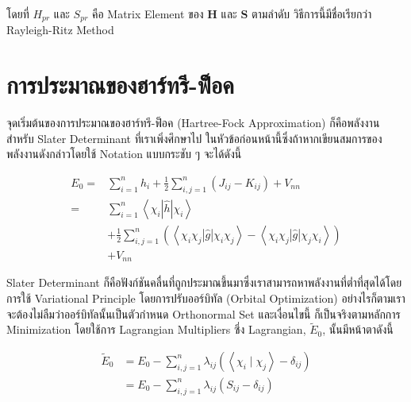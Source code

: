 \noindent โดยที่ $H_{pr}$ และ $S_{pr}$ คือ Matrix Element ของ $\boldsymbol{H}$ และ $\boldsymbol{S}$ ตามลำดับ
วิธีการนี้มีชื่อเรียกว่า Rayleigh-Ritz Method

\section{การประมาณของฮาร์ทรี-ฟ็อค}

จุดเริ่มต้นของการประมาณของฮาร์ทรี-ฟ็อค (Hartree-Fock Approximation) ก็คือพลังงานสำหรับ Slater Determinant ที่เราเพิ่งศึกษาไป%
ในหัวข้อก่อนหน้านี้ซึ่งถ้าหากเขียนสมการของพลังงานดังกล่าวโดยใช้ Notation แบบกระชับ ๆ จะได้ดังนี้

\begin{equation}
    \begin{aligned}
        \label{eq:energy_slater_determinant_compact}
        E_0
        = & \sum_{i=1}^n h_i
        + \frac{1}{2} \sum_{i, j=1}^n\left(J_{i j}-K_{i j}\right)
        + V_{n n}                                                              \\
        = & \sum_{i=1}^n\left\langle\chi_i|\hat{h}| \chi_i\right\rangle        \\
          & + \frac{1}{2} \sum_{i, j=1}^n
        \left(\left\langle\chi_i \chi_j|\hat{g}| \chi_i \chi_j\right\rangle
        - \left\langle\chi_i \chi_j|\hat{g}| \chi_j \chi_i\right\rangle\right) \\
          & + V_{n n}
    \end{aligned}
\end{equation}

Slater Determinant ก็คือฟังก์ชันคลื่นที่ถูกประมาณขึ้นมาซึ่งเราสามารถหาพลังงานที่ต่ำที่สุดได้โดยการใช้ Variational Principle
โดยการปรับออร์บิทัล (Orbital Optimization) อย่างไรก็ตามเราจะต้องไม่ลืมว่าออร์บิทัลนั้นเป็นตัวกำหนด Orthonormal Set และเงื่อนไขนี้%
ก็เป็นจริงตามหลักการ Minimization โดยใช้การ Lagrangian Multipliers ซึ่ง Lagrangian, $\tilde{E}_0$, นั้นมีหน้าตาดังนี้

\begin{equation}
    \begin{aligned}
        \tilde{E}_0
         & = E_0-\sum_{i, j=1}^n
        \lambda_{i j} \left(\left\langle\chi_i \mid \chi_j\right\rangle-\delta_{i j}\right) \\
         & = E_0-\sum_{i, j=1}^n
        \lambda_{i j} \left(S_{i j}-\delta_{i j}\right)
    \end{aligned}
\end{equation}

